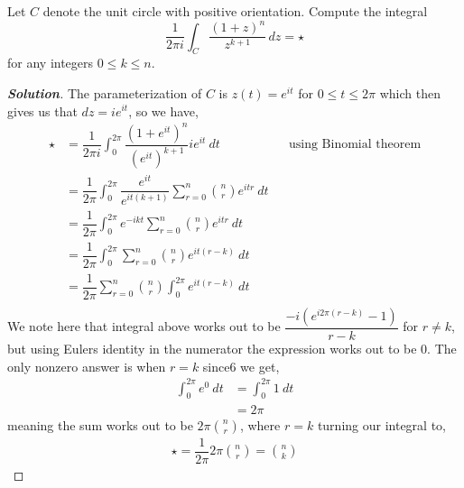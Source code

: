 \documentclass[11pt]{article}
\newenvironment{problem}[2][Problem\!]{\begin{trivlist}
\item[\hskip \labelsep {\bfseries #1}\hskip \labelsep {\bfseries #2}]}{\end{trivlist}}
\newenvironment{solution}{\begin{proof}[\textbf{\textit{Solution}}] }{\end{proof}}
\renewcommand{\leq}{\leqslant}
\begin{document}
\begin{problem}{6.4}
Let $C$ denote the unit circle with positive orientation. Compute the integral
\[\frac{1}{2\pi i}\int_C \frac{(1 + z)^n}{z^{k+1}}\,dz = \star\]
for any integers $0 \leq k \leq n$.
\end{problem}
\begin{solution}
    The parameterization of $C$ is $z(t) = e^{it}$ for $0 \leq t\leq 2\pi$ which then gives us that $dz = ie^{it}$, so we have,
    \begin{align*}
        \star &=\dfrac{1}{2\pi i } \int_0^{2\pi} \dfrac{(1 + e^{i t})^{n}}{(e^{it})^{k + 1}}ie^{it}\  dt && \text{using Binomial theorem} \\
       &=  \dfrac{1}{2\pi }\int_0^{2\pi} \dfrac{e^{it}}{e^{it(k + 1)}}\sum_{r = 0}^{n} \binom{n}{r}e^{it r} \ dt \\
       &= \dfrac{1}{2\pi} \int_0^{2\pi}e^{-ikt}\sum_{r= 0}^{n}\binom{n}{r}e^{itr}\ dt \\
       &= \dfrac{1}{2\pi} \int_0^{2\pi}\sum_{r= 0}^{n}\binom{n}{r}e^{it(r - k)}\ dt \\
       &=\dfrac{1}{2\pi} \sum_{r= 0}^{n}\binom{n}{r}\int_0^{2\pi}e^{it(r - k)}\ dt \\
    \end{align*}
    We note here that integral above works out to be $\dfrac{-i(e^{i2\pi (r-k)} - 1)}{r-k}$ for $r\neq k$, but using Eulers identity in the numerator the expression works out to be 0. The only nonzero answer is when $r = k$ since6 we get,
    \begin{align*}
        \int_0^{2\pi}e^{0}\ dt &= \int_0^{2\pi}1 \ dt \\
        &= 2\pi
    \end{align*}
    meaning the sum works out to be $2\pi \binom{n}{r}$, where $r = k$  turning our integral to,
    \begin{align*}
        \star = \dfrac{1}{2\pi}2\pi \binom{n}{r} = \binom{n}{k}
    \end{align*}
\end{solution}

\newpage  %
\end{document}
